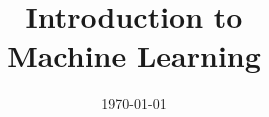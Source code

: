 \documentclass[a4paper,12pt]{report}
\institute{UniTs - University of Trieste}
\title{Introduction to\\Machine Learning}
\date{\today}
\begin{document}
\maketitle



\toc


\end{document}
